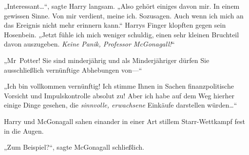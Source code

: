 „Interessant…“, sagte Harry langsam. „Also gehört einiges davon mir. In einem gewissen Sinne. Von mir verdient, meine ich. Sozusagen. Auch wenn ich mich an das Ereignis nicht mehr erinnern kann.“ Harrys Finger klopften gegen sein Hosenbein. „Jetzt fühle ich mich weniger schuldig, einen sehr kleinen Bruchteil davon auszugeben. \emph{Keine Panik, Professor McGonagall!}“

„Mr~Potter! Sie sind minderjährig und als Minderjähriger dürfen Sie ausschließlich vernünftige Abhebungen von—“

„Ich bin vollkommen vernünftig! Ich stimme Ihnen in Sachen finanzpolitische Vorsicht und Impulskontrolle absolut zu! Aber ich habe auf dem Weg hierher einige Dinge gesehen, die \emph{sinnvolle, erwachsene} Einkäufe darstellen würden…“

Harry und McGonagall sahen einander in einer Art stillem Starr-Wettkampf fest in die Augen.

„Zum Beispiel?“, sagte McGonagall schließlich.

